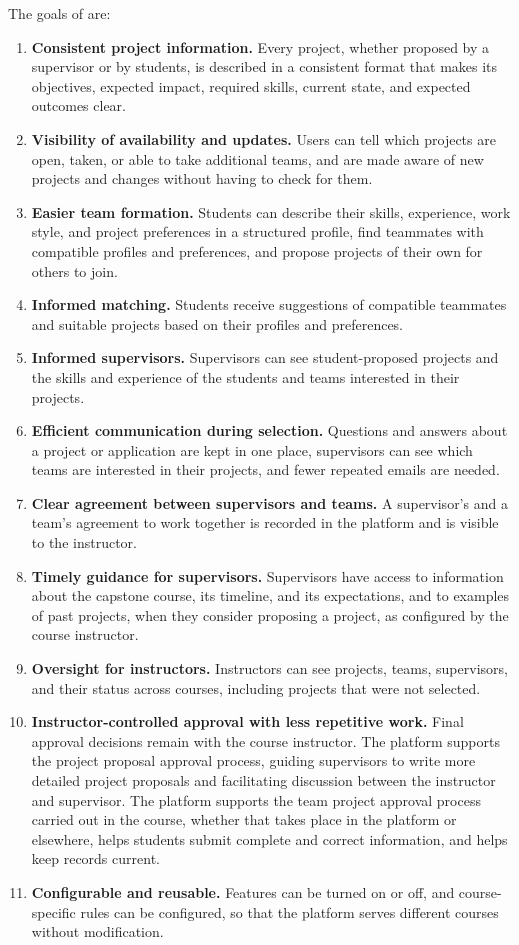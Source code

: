 \documentclass[12pt]{article}
\newcounter{tin}
\begin{document}
  The goals of \projname{} are:
  \begin{enumerate}
    \item \textbf{Consistent project information.} Every project, whether proposed by a supervisor or by
    students, is described in a consistent format that makes its objectives, expected impact, required
    skills, current state, and expected outcomes clear.
    \item \textbf{Visibility of availability and updates.} Users can tell which projects are open, taken, or
    able to take additional teams, and are made aware of new projects and changes without having to check
    for them.
    \item \textbf{Easier team formation.} Students can describe their skills, experience, work style, and
    project preferences in a structured profile, find teammates with compatible profiles and preferences,
    and propose projects of their own for others to join.
    \item \textbf{Informed matching.} Students receive suggestions of compatible teammates and suitable
    projects based on their profiles and preferences.
    \item \textbf{Informed supervisors.} Supervisors can see student-proposed projects and the skills and
    experience of the students and teams interested in their projects.
    \item \textbf{Efficient communication during selection.} Questions and answers about a project or
    application are kept in one place, supervisors can see which teams are interested in their projects,
    and fewer repeated emails are needed.
    \item \textbf{Clear agreement between supervisors and teams.} A supervisor's and a team's agreement to
    work together is recorded in the platform and is visible to the instructor.
    \item \textbf{Timely guidance for supervisors.} Supervisors have access to information about the
    capstone course, its timeline, and its expectations, and to examples of past projects, when they
    consider proposing a project, as configured by the course instructor.
    \item \textbf{Oversight for instructors.} Instructors can see projects, teams, supervisors, and their
    status across courses, including projects that were not selected.
    \item \textbf{Instructor-controlled approval with less repetitive work.} Final approval decisions remain
    with the course instructor. The platform supports the project proposal approval process, guiding supervisors to write
    more detailed project proposals and facilitating discussion between the instructor and supervisor.
    The platform supports the team project approval process carried out in the course,
    whether that takes place in the platform or elsewhere, helps students submit complete and correct
    information, and helps keep records current.
    \item \textbf{Configurable and reusable.} Features can be turned on or off, and course-specific
    rules can be configured, so that the platform serves different courses without modification.
  \end{enumerate}
\end{document}
